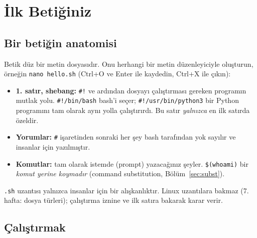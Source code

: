 \documentclass[11pt,a4paper]{article}
\newcommand{\cmd}[1]{\texttt{#1}}
\begin{document}
\section{İlk Betiğiniz}

\subsection{Bir betiğin anatomisi}

Betik düz bir metin dosyasıdır. Onu herhangi bir metin düzenleyiciyle oluşturun, örneğin \cmd{nano hello.sh} (Ctrl+O ve Enter ile kaydedin, Ctrl+X ile çıkın):



\begin{itemize}
  \item \textbf{1. satır, shebang:} \texttt{\#!} ve ardından dosyayı çalıştırması gereken programın mutlak yolu. \texttt{\#!/bin/bash} bash'i seçer; \texttt{\#!/usr/bin/python3} bir Python programını tam olarak aynı yolla çalıştırırdı. Bu satır \emph{yalnızca} en ilk satırda özeldir.
  \item \textbf{Yorumlar:} \texttt{\#} işaretinden sonraki her şey bash tarafından yok sayılır ve insanlar için yazılmıştır.
  \item \textbf{Komutlar:} tam olarak istemde (prompt) yazacağınız şeyler. \texttt{\$(whoami)} bir \emph{komut yerine koymadır} (command substitution, Bölüm~\ref{sec:subst}).
\end{itemize}
\texttt{.sh} uzantısı yalnızca insanlar için bir alışkanlıktır. Linux uzantılara bakmaz (7. hafta: dosya türleri); çalıştırma iznine ve ilk satıra bakarak karar verir.

\subsection{Çalıştırmak}
\label{sec:running}


\end{document}
